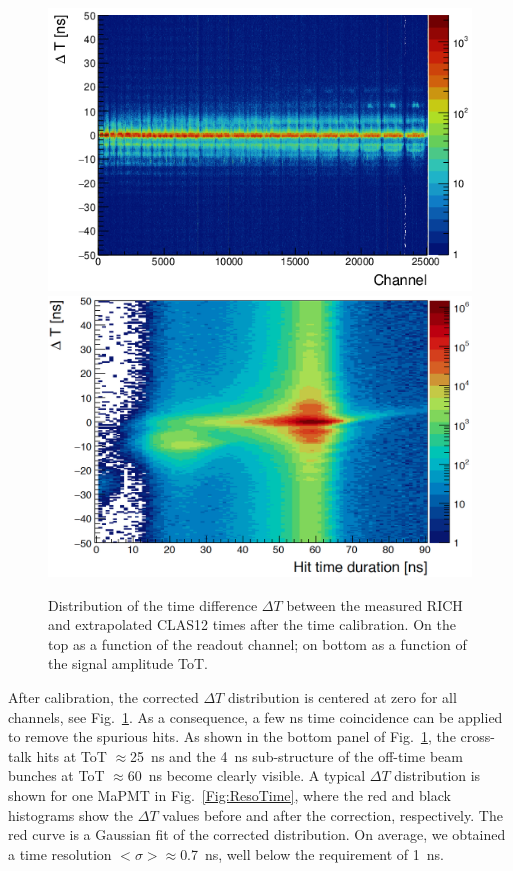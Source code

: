 \documentclass[5p,times,twocolumn]{elsarticle}
\def\dT{$\Delta T$ }
\begin{document}
\begin{figure}[t]
\begin{center}
\includegraphics[width=1.0\columnwidth]{dt_vs_anode_cor.png}
\includegraphics[width=1.0\columnwidth]{dt_vs_dur_cor.png}
\end{center}
\caption{Distribution of the time difference \dT between the measured RICH and extrapolated CLAS12 times after
  the time calibration. On the top as a function of the readout channel; on bottom as a function of the signal amplitude ToT.}
\label{Fig:DT_corr}
\end{figure}

After calibration, the corrected $\Delta T$ distribution is centered at zero for all channels, see
Fig.~\ref{Fig:DT_corr}. As a consequence, a few ns time coincidence can be applied to remove the spurious hits. As
shown in the bottom panel of Fig.~\ref{Fig:DT_corr}, the cross-talk hits at ToT $\approx$25~ns and the 4~ns
sub-structure of the off-time beam bunches at ToT $\approx$60~ns become clearly visible. A typical \dT
distribution is shown for one MaPMT in Fig.~\ref{Fig:ResoTime}, where the red and black histograms show the
$\Delta T$ values before and after the correction, respectively. The red curve is a Gaussian fit of the
corrected distribution.
On average, we obtained a time resolution $<\sigma> \approx$0.7~ns, well below the requirement of 1~ns.
\end{document}
